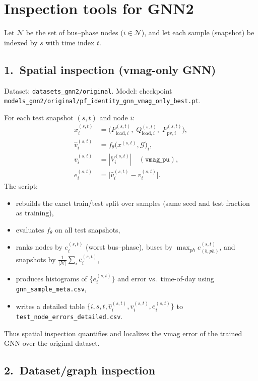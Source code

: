\documentclass[11pt]{article}
\begin{document}
\section*{Inspection tools for GNN2}

Let $\mathcal{N}$ be the set of bus--phase nodes ($i\in\mathcal{N}$), and let
each sample (snapshot) be indexed by $s$ with time index $t$.

\subsection*{1.\ Spatial inspection (vmag-only GNN)}

Dataset: \texttt{datasets\_gnn2/original}. Model: checkpoint
\texttt{models\_gnn2/original/pf\_identity\_gnn\_vmag\_only\_best.pt}.

For each test snapshot $(s,t)$ and node $i$:
\begin{align*}
  x_i^{(s,t)} &= \bigl(P_{\mathrm{load},i}^{(s,t)},\;
                      Q_{\mathrm{load},i}^{(s,t)},\;
                      P_{\mathrm{pv},i}^{(s,t)}\bigr),\\
  \hat v_i^{(s,t)} &= f_\theta\bigl(x^{(s,t)},\mathcal{G}\bigr)_i,\\
  v_i^{(s,t)} &= |V_i^{(s,t)}|\quad(\texttt{vmag\_pu}),\\
  e_i^{(s,t)} &= \bigl|\hat v_i^{(s,t)}-v_i^{(s,t)}\bigr|.
\end{align*}
The script:
\begin{itemize}
  \item rebuilds the exact train/test split over samples (same seed and test fraction as training),
  \item evaluates $f_\theta$ on all test snapshots,
  \item ranks nodes by $e_i^{(s,t)}$ (worst bus--phase), buses by
        $\max_{ph} e_{(b,ph)}^{(s,t)}$, and snapshots by
        $\frac{1}{|\mathcal{N}|}\sum_i e_i^{(s,t)}$,
  \item produces histograms of $\{e_i^{(s,t)}\}$ and error vs.\ time-of-day
        using \texttt{gnn\_sample\_meta.csv},
  \item writes a detailed table
        $\{i,s,t,\hat v_i^{(s,t)},v_i^{(s,t)},e_i^{(s,t)}\}$
        to \texttt{test\_node\_errors\_detailed.csv}.
\end{itemize}
Thus spatial inspection quantifies and localizes the vmag error of the trained
GNN over the original dataset.

\subsection*{2.\ Dataset/graph inspection}
\end{document}

